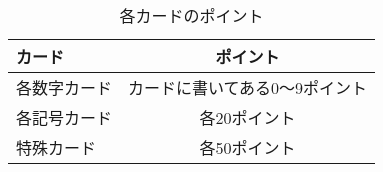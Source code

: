 \documentclass[11pt]{ltjsarticle}
\begin{document}
\begin{table}[h]
  \begin{center}
    \caption{各カードのポイント}
    \begin{tabular}{|l|c|} \hline
      カード & ポイント \\ \hline \hline
      各数字カード & カードに書いてある0～9ポイント \\
      各記号カード & 各20ポイント \\
      特殊カード & 各50ポイント \\ \hline
    \end{tabular}
    \label{tab:カードポイント}
  \end{center}
\end{table}
\end{document}
